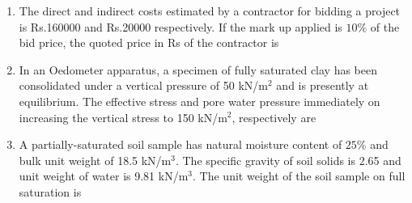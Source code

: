 \documentclass[journal,12pt,onecolumn]{article}
\theoremstyle{remark}
\begin{document}
\begin{enumerate}
\hfill{}
\begin{enumerate}
\end{enumerate}

\item The direct and indirect costs estimated by a contractor for bidding a project is Rs.160000 and Rs.20000 respectively. If the mark up applied is $10\%$ of the bid price, the quoted price in Rs of the contractor is

\hfill{}
\begin{enumerate}
\end{enumerate}

\item In an Oedometer apparatus, a specimen of fully saturated clay has been consolidated under a vertical pressure of 50 kN/m$^2$ and is presently at equilibrium. The effective stress and pore water pressure immediately on increasing the vertical stress to 150 kN/m$^2$, respectively are

\hfill{}
\begin{enumerate}
\end{enumerate}

\item A partially-saturated soil sample has natural moisture content of $25\%$ and bulk unit weight of 18.5 kN/m$^3$. The specific gravity of soil solids is 2.65 and unit weight of water is 9.81 kN/m$^3$. The unit weight of the soil sample on full saturation is


\end{enumerate}
\end{document}
